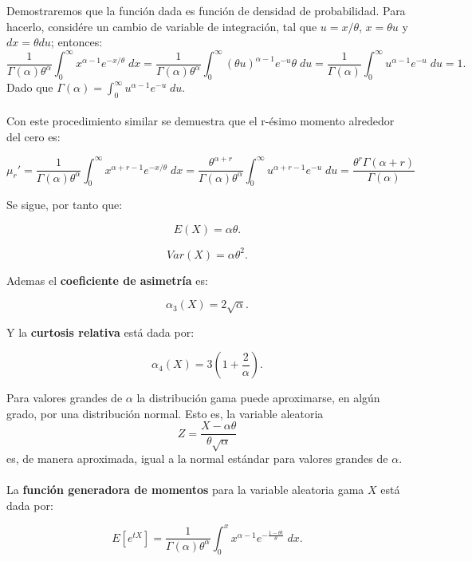 Demostraremos que la función dada es función de densidad de probabilidad. Para hacerlo, considére un cambio de variable de integración, tal que $u=x/\theta$, $x=\theta u$ y $dx=\theta du$; entonces:
$$\dfrac{1}{\Gamma(\alpha)\theta^\alpha}\int_0^\infty x^{\alpha-1}e^{-x/\theta}\; dx = \dfrac{1}{\Gamma(\alpha)\theta^\alpha} \int_0^\infty \left(\theta u\right)^{\alpha-1} e^{-u}\theta\; du = \dfrac{1}{\Gamma(\alpha)}\int_0^\infty u^{\alpha -1 }e^{-u}\; du = 1.$$
Dado que $\Gamma(\alpha)=\displaystyle\int_0^{\infty} u^{\alpha -1 }e^{-u}\; du.$\\\\

Con este procedimiento similar se demuestra que el r-ésimo momento alrededor del cero es:

$$\mu_r' = \dfrac{1}{\Gamma(\alpha)\theta^\alpha}\int_0^\infty x^{\alpha+r-1}e^{-x/\theta}\; dx = \dfrac{\theta^{\alpha+r}}{\Gamma(\alpha)\theta^{\alpha}}\int_0^\infty u^{\alpha+r-1}e^{-u}\; du = \dfrac{\theta^r\Gamma(\alpha+r)}{\Gamma(\alpha)}$$

Se sigue, por tanto que:

\begin{tcolorbox}
    $$E(X)=\alpha\theta.$$
\end{tcolorbox}

\begin{tcolorbox}
    $$Var(X)=\alpha \theta^2.$$
\end{tcolorbox}

Ademas el \textbf{coeficiente de asimetría} es:
\begin{tcolorbox}
    $$\alpha_3(X)=2\sqrt{\alpha}.$$
\end{tcolorbox}

Y la \textbf{curtosis relativa} está dada por:
\begin{tcolorbox}
    $$\alpha_4(X)=3\left(1+\dfrac{2}{\alpha}\right).$$
\end{tcolorbox}

Para valores grandes de $\alpha$ la distribución gama puede aproximarse, en algún grado, por una distribución normal. Esto es, la variable aleatoria
$$Z=\dfrac{X-\alpha\theta}{\theta\sqrt{\alpha}}$$
es, de manera aproximada, igual a la normal estándar para valores grandes de $\alpha$.\\\\

La \textbf{función generadora de momentos} para la variable aleatoria gama $X$ está dada por:

$$E[e^{tX}]=\dfrac{1}{\Gamma(\alpha)\theta^{\alpha}}\int_{0}^x x^{\alpha-1}e^{-\frac{1-\theta t}{\theta}}\; dx.$$


